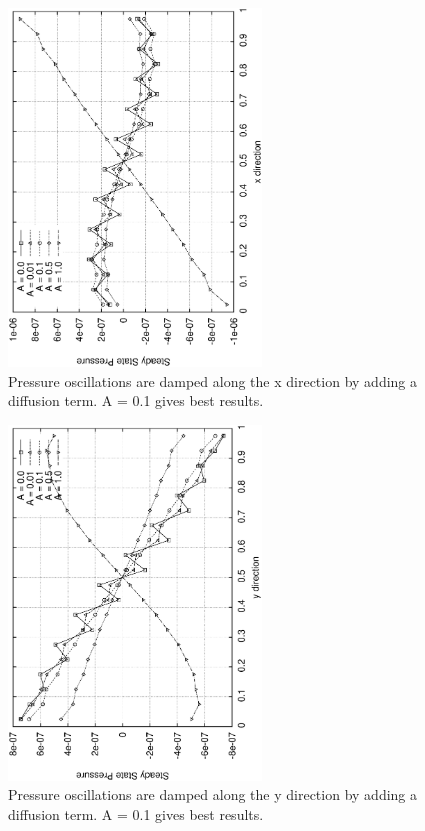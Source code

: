 \documentclass[a4paper, 10pt]{article}
\begin{document}
\begin{enumerate}[I]
\begin{enumerate} [a]
\begin{figure}
  \centering
  \includegraphics[width=0.6\textwidth, angle = -90]{../plot/oscillation/osc.eps}
  \caption{Pressure oscillations are damped along the x direction by adding a diffusion term. A = 0.1 gives best results.}
  \label{smooth}
\end{figure}

\begin{figure}
  \centering
  \includegraphics[width=0.6\textwidth, angle = -90]{../plot/oscillation/osci.eps}
  \caption{Pressure oscillations are damped along the y direction by adding a diffusion term. A = 0.1 gives best results.}
  \label{smooth2}
\end{figure}


\end{enumerate}
\end{enumerate}
\end{document}
